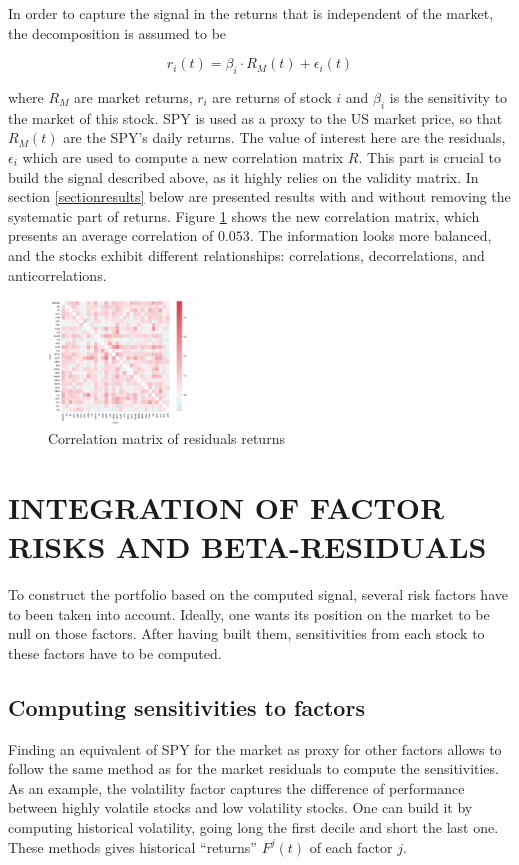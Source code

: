 \documentclass[letterpaper, 10 pt, conference]{ieeeconf}  %
\begin{document}
In order to capture the signal in the returns that is independent of the market, the decomposition is assumed to be

$$r_i(t) = \beta_i \cdot R_M(t) + \epsilon_i(t)$$ 

where $R_M$ are market returns, $r_i$ are returns of stock $i$ and $\beta_i$ is the sensitivity to the market of this stock. SPY is used as a proxy to the US market price, so that $R_M(t)$ are the SPY's daily returns. The value of interest here are the residuals, $\epsilon_i$ which are used to compute a new correlation matrix $R$. This part is crucial to build the signal described above, as it highly relies on the validity matrix. In section \ref{sectionresults} below are presented results with and without removing the systematic part of returns. Figure \ref{goodcorrelation} shows the new correlation matrix, which presents an average correlation of $0.053$. The information looks more balanced, and the stocks exhibit different relationships: correlations, decorrelations, and anticorrelations.

\begin{figure}[thpb]
\centering
\includegraphics[width=140px]{img/good_correlation.png}
\caption{Correlation matrix of residuals returns}
\label{goodcorrelation}
\end{figure}

\section{INTEGRATION OF FACTOR RISKS AND BETA-RESIDUALS}

To construct the portfolio based on the computed signal, several risk factors have to been taken into account. Ideally, one wants its position on the market to be null on those factors. After having built them, sensitivities from each stock to these factors have to be computed.

\subsection{Computing sensitivities to factors}

Finding an equivalent of SPY for the market as proxy for other factors allows to follow the same method as for the market residuals to compute the sensitivities. As an example, the volatility factor captures the difference of performance between highly volatile stocks and low volatility stocks. One can build it by computing historical volatility, going long the first decile and short the last one. These methods gives historical ``returns'' $F^j(t)$ of each factor $j$.
\end{document}
